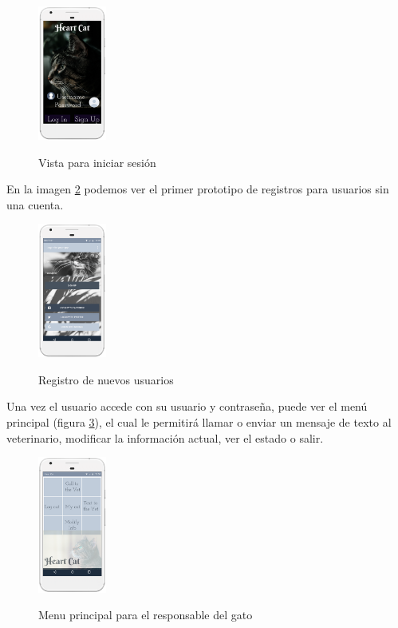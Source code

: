 \documentclass[letterpaper, 10 pt, conference]{ieeeconf}  %
\begin{document}
\begin{figure}
\centering
\includegraphics[width=0.2\textwidth]{hc2.png}
\label{fig:login}
\caption{Vista para iniciar sesi\'on}
\end{figure}

En la imagen \ref{fig:signup} podemos ver el primer prototipo de registros para usuarios sin una cuenta.\\

\begin{figure}
\centering
\includegraphics[width=0.2\textwidth]{hc3.PNG}
\label{fig:signup}
\caption{Registro de nuevos usuarios}
\end{figure}

Una vez el usuario accede con su usuario y contrase\~na, puede ver el men\'u principal (figura \ref{fig:menu}), el cual le permitir\'a llamar o enviar un mensaje de texto al veterinario, modificar la informaci\'on actual, ver el estado o salir.\\

\begin{figure}
\centering
\includegraphics[width=0.2\textwidth]{hc4.PNG}
\label{fig:menu}
\caption{Menu principal para el responsable del gato}
\end{figure}
\end{document}
